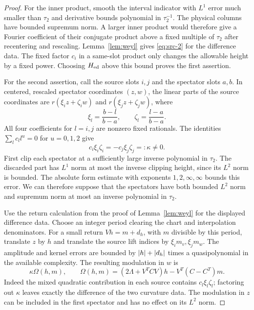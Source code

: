 \begin{proof}
For the inner product, smooth the interval indicator with $L^1$ error
much smaller than $\tau_2$ and derivative bounds polynomial in
$\tau_2^{-1}$.  The physical columns have bounded supremum norm.  A
larger inner product would therefore give a Fourier coefficient of their
conjugate product above a fixed multiple of $\tau_2$ after recentering and
rescaling.  Lemma~\ref{lem:weyl} gives \eqref{eq:src-2} for the difference
data.  The fixed factor $c_i$ in a same-slot product only changes the
allowable height by a fixed power.  Choosing $H_{\rm ed}$ above this
bound proves the first assertion.

For the second assertion, call the source slots $i,j$ and the spectator
slots $a,b$.  In centered, rescaled spectator coordinates $(z,w)$, the
linear parts of the source coordinates are
$r(\xi_i z+\zeta_i w)$ and $r(\xi_j z+\zeta_j w)$, where
\[
 \xi_l=\frac{b-l}{b-a},\qquad \zeta_l=\frac{l-a}{b-a}.
\]
All four coefficients for $l=i,j$ are nonzero fixed rationals.  The
identities $\sum_l c_l l^u=0$ for $u=0,1,2$ give
\[
 c_i\xi_i\zeta_i=-c_j\xi_j\zeta_j=:\kappa\ne0.
\]
First clip each spectator at a sufficiently large inverse polynomial in
$\tau_2$.  The discarded part has $L^1$ norm at most the inverse clipping
height, since its $L^2$ norm is bounded.  The absolute form estimate with
exponents $1,2,\infty,\infty$ bounds this error.  We can therefore suppose
that the spectators have both bounded $L^2$ norm and supremum norm at
most an inverse polynomial in $\tau_2$.

Use the return calculation from the proof of Lemma~\ref{lem:weyl} for
the displayed difference data.  Choose an integer period clearing the
chart and interpolation denominators.  For a small return
$Vh=m+d_h$, with $m$ divisible by this period, translate $z$ by $h$ and
translate the source lift indices by $\xi_i m_v,\xi_j m_w$.
The amplitude and kernel errors are bounded by
$\lvert h\rvert+\lvert d_h\rvert$ times a quasipolynomial in the available complexity.
The resulting modulation in $w$ is
\[
 \kappa\Omega(h,m),\qquad
 \Omega(h,m)=(2\Lambda+V^T C V)h-V^T(C-C^T)m.
\]
Indeed the mixed quadratic contribution in each source contains
$c_l\xi_l\zeta_l$; factoring out $\kappa$ leaves exactly the difference
of the two curvature data.  The modulation in $z$ can be included in
the first spectator and has no effect on its $L^2$ norm.


\end{proof}
